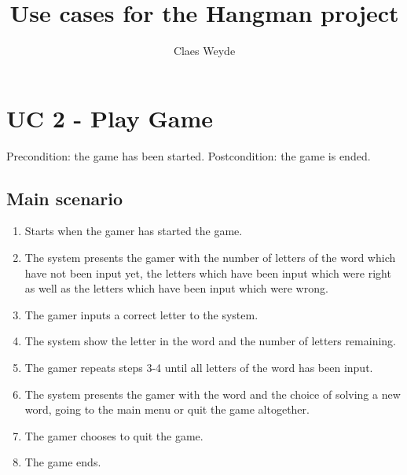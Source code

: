 \documentclass[12pt, letterpaper]{article}
\title{Use cases for the Hangman project}
\author{Claes Weyde}
\begin{document}
\maketitle
\newpage
\tableofcontents{}
\newpage

\section{UC 2 - Play Game}
Precondition: the game has been started.
\newline
Postcondition: the game is ended.

\subsection{Main scenario}
\begin{enumerate}
	\item Starts when the gamer has started the game.
	\item The system presents the gamer with the number of letters of the word which have not been input yet, the letters which have been input which were right as well as the letters which have been input which were wrong.
	\item The gamer inputs a correct letter to the system.
	\item The system show the letter in the word and the number of letters remaining.
	\item The gamer repeats steps 3-4 until all letters of the word has been input.
	\item The system presents the gamer with the word and the choice of solving a new word, going to the main menu or quit the game altogether.
	\item The gamer chooses to quit the game.
	\item The game ends. 
\end{enumerate}
\end{document}
